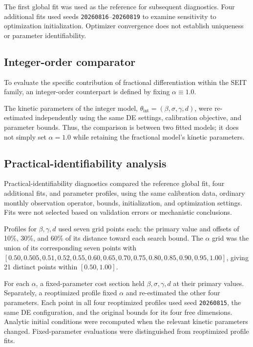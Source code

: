 \documentclass[pdflatex,sn-mathphys-ay]{sn-jnl}
\begin{document}
The first global fit was used as the reference for subsequent diagnostics. Four additional fits used seeds \texttt{20260816}--\texttt{20260819} to examine sensitivity to optimization initialization. Optimizer convergence does not establish uniqueness or parameter identifiability.

\subsection{Integer-order comparator}

To evaluate the specific contribution of fractional differentiation within the SEIT family, an integer-order counterpart is defined by fixing $\alpha \equiv 1.0$.

The kinetic parameters of the integer model, $\theta_{\text{int}}=(\beta,\sigma,\gamma,d)$, were re-estimated independently using the same DE settings, calibration objective, and parameter bounds. Thus, the comparison is between two fitted models; it does not simply set $\alpha=1.0$ while retaining the fractional model's kinetic parameters.

\subsection{Practical-identifiability analysis}

Practical-identifiability diagnostics compared the reference global fit, four additional fits, and parameter profiles, using the same calibration data, ordinary monthly observation operator, bounds, initialization, and optimization settings. Fits were not selected based on validation errors or mechanistic conclusions.

Profiles for $\beta,\gamma,d$ used seven grid points each: the primary value and offsets of 10\%, 30\%, and 60\% of its distance toward each search bound. The $\alpha$ grid was the union of its corresponding seven points with $[0.50,0.505,0.51,0.52,0.55,0.60,0.65,0.70,0.75,0.80,0.85,0.90,0.95,1.00]$, giving 21 distinct points within $[0.50,1.00]$. 

For each $\alpha$, a fixed-parameter cost section held $\beta,\sigma,\gamma,d$ at their primary values. Separately, a reoptimized profile fixed $\alpha$ and re-estimated the other four parameters. Each point in all four reoptimized profiles used seed \texttt{20260815}, the same DE configuration, and the original bounds for its four free dimensions. Analytic initial conditions were recomputed when the relevant kinetic parameters changed. Fixed-parameter evaluations were distinguished from reoptimized profile fits.
\end{document}
